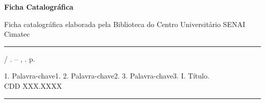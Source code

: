 \begin{fichacatalografica}
    \begin{flushleft}
    \large\textbf{Ficha Catalográfica}
    \end{flushleft}
	\begin{flushleft}
	Ficha catalográfica elaborada pela Biblioteca do Centro Universitário SENAI Cimatec
	\end{flushleft}
	\begin{center}					%
	\hrule
	\begin{minipage}[c][5cm]{13.5cm}		%
	\small
	\imprimirautorsobrenome
	
	\hspace{0.5cm} 
	\imprimirtitulo\hspace{1mm}/ \imprimirautor. -- \imprimirlocal, \imprimirdata. \thelastpage p. 
	
	\hspace{0.5cm} 
	1. Palavra-chave1. 2. Palavra-chave2. 3. Palavra-chave3. I. Título. \\
	
	\hspace{0.5cm} 
	CDD XXX.XXXX
	
	\end{minipage}
	\hrule
	\end{center}
\end{fichacatalografica}